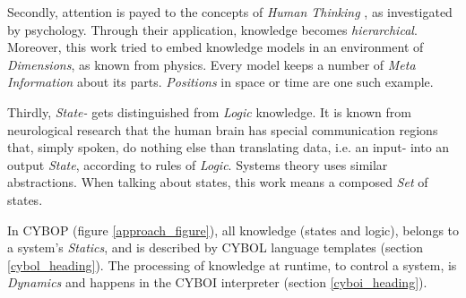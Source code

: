 Secondly, attention is payed to the concepts of \emph{Human Thinking}
\cite{heller2004}, as investigated by psychology. Through their application,
knowledge becomes \emph{hierarchical}. Moreover, this work tried to embed
knowledge models in an environment of \emph{Dimensions}, as known from physics.
Every model keeps a number of \emph{Meta Information} about its parts.
\emph{Positions} in space or time are one such example.

Thirdly, \emph{State-} gets distinguished from \emph{Logic} knowledge. It is
known from neurological research that the human brain has special communication
regions that, simply spoken, do nothing else than translating data, i.e. an
input- into an output \emph{State}, according to rules of \emph{Logic}. Systems
theory uses similar abstractions. When talking about states, this work means a
composed \emph{Set} of states.

In CYBOP (figure \ref{approach_figure}), all knowledge (states and logic),
belongs to a system's \emph{Statics}, and is described by CYBOL language
templates (section \ref{cybol_heading}). The processing of knowledge at
runtime, to control a system, is \emph{Dynamics} and happens in the CYBOI
interpreter (section \ref{cyboi_heading}).




